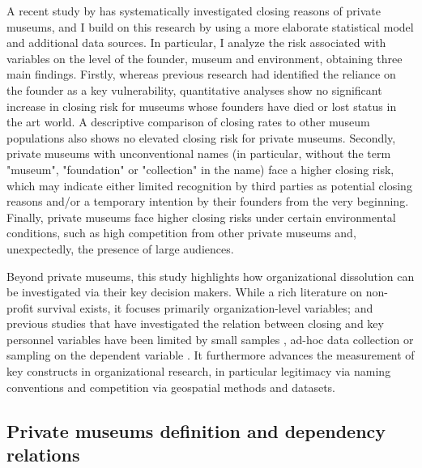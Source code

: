 \documentclass[12pt]{article}
\begin{document}
A recent study by \textcite{Velthuis_Gera_2024_fragility} has systematically investigated closing reasons of private museums, and I build on this research by using a more elaborate statistical model and additional data sources.
In particular, I analyze the risk associated with variables on the level of the founder, museum and environment, obtaining three main findings. 
Firstly, whereas previous research had identified the reliance on the founder as a key vulnerability, quantitative analyses show no significant increase in closing risk for museums whose founders have died or lost status in the art world.
A descriptive comparison of closing rates to other museum populations also shows no elevated closing risk for private museums.
Secondly, private museums with unconventional names (in particular, without the term "museum", "foundation" or "collection" in the name) face a higher closing risk, which may indicate either limited recognition by third parties as potential closing reasons and/or a temporary intention by their founders from the very beginning.
Finally, private museums face higher closing risks under certain environmental conditions, such as high competition from other private museums and, unexpectedly, the presence of large audiences.





Beyond private museums, this study highlights how organizational dissolution can be investigated via their key decision makers.
While a rich literature on non-profit survival exists, it focuses primarily organization-level variables; and previous studies that have investigated the relation between closing and key personnel variables have been limited by small samples \parencite{Searing_2020_zombies}, ad-hoc data collection \parencite{Chambre_Fatt_2002_liability} or sampling on the dependent variable \parencite{HernandezOrtiz_2022_discontinuity,Hager_etal_1996_grave}.
It furthermore advances the measurement of key constructs in organizational research, in particular legitimacy via naming conventions and competition via geospatial methods and datasets.
\subsection*{Private museums definition and dependency relations}
\end{document}
